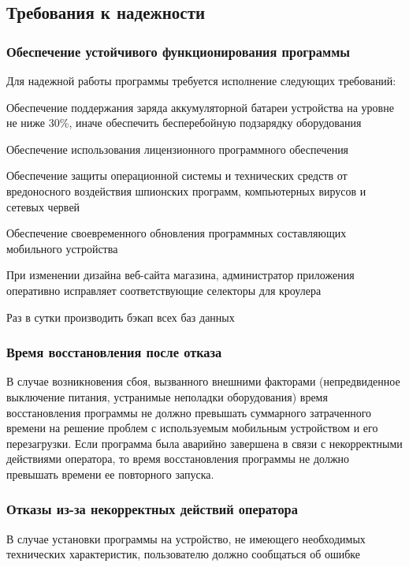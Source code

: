 \subsection{Требования к надежности}
\subsubsection{Обеспечение устойчивого функционирования программы}

Для надежной работы программы требуется исполнение следующих требований:
\begin{my_enumerate}
\item Обеспечение поддержания заряда аккумуляторной батареи устройства на
уровне не ниже 30\%, иначе обеспечить бесперебойную подзарядку оборудования
\item Обеспечение использования лицензионного программного обеспечения
\item Обеспечение защиты операционной системы и технических средств от
вредоносного воздействия шпионских программ, компьютерных вирусов и сетевых
червей
\item Обеспечение своевременного обновления программных составляющих мобильного устройства
\item При изменении дизайна веб-сайта магазина, администратор приложения оперативно
исправляет соответствующие селекторы для кроулера
\item Раз в сутки производить бэкап всех баз данных
\end{my_enumerate}


\subsubsection{Время восстановления после отказа}
В случае возникновения сбоя, вызванного внешними факторами (непредвиденное
выключение питания, устранимые неполадки оборудования) время восстановления
программы не должно превышать суммарного затраченного времени на решение
проблем с используемым мобильным устройством и его перезагрузки. Если программа
была аварийно завершена в связи с некорректными действиями оператора, то время
восстановления программы не должно превышать времени ее повторного запуска.

\subsubsection{Отказы из-за некорректных действий оператора}
В случае установки программы на устройство, не имеющего необходимых технических
характеристик, пользователю должно сообщаться об ошибке

